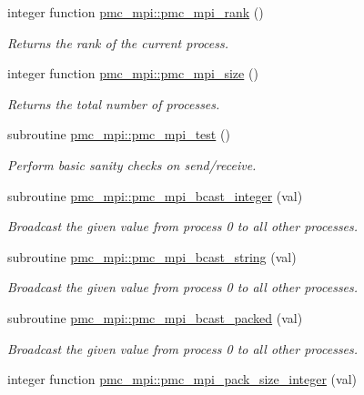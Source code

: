 \begin{DoxyCompactItemize}
integer function \mbox{\hyperlink{namespacepmc__mpi_a1ac93b34387cb8dec130a10c4f959e9b}{pmc\+\_\+mpi\+::pmc\+\_\+mpi\+\_\+rank}} ()
\begin{DoxyCompactList}\small\item\em Returns the rank of the current process. \end{DoxyCompactList}\item 
integer function \mbox{\hyperlink{namespacepmc__mpi_abc7ec25375502391c6ab03a7459b5cd0}{pmc\+\_\+mpi\+::pmc\+\_\+mpi\+\_\+size}} ()
\begin{DoxyCompactList}\small\item\em Returns the total number of processes. \end{DoxyCompactList}\item 
subroutine \mbox{\hyperlink{namespacepmc__mpi_a92cc3237c6fa0152c4da6571ba5fdef9}{pmc\+\_\+mpi\+::pmc\+\_\+mpi\+\_\+test}} ()
\begin{DoxyCompactList}\small\item\em Perform basic sanity checks on send/receive. \end{DoxyCompactList}\item 
subroutine \mbox{\hyperlink{namespacepmc__mpi_a8c5c43ef03395c028808ccc21c6afb1b}{pmc\+\_\+mpi\+::pmc\+\_\+mpi\+\_\+bcast\+\_\+integer}} (val)
\begin{DoxyCompactList}\small\item\em Broadcast the given value from process 0 to all other processes. \end{DoxyCompactList}\item 
subroutine \mbox{\hyperlink{namespacepmc__mpi_a4cd3eb742c928a5f4f796dd8d76263cc}{pmc\+\_\+mpi\+::pmc\+\_\+mpi\+\_\+bcast\+\_\+string}} (val)
\begin{DoxyCompactList}\small\item\em Broadcast the given value from process 0 to all other processes. \end{DoxyCompactList}\item 
subroutine \mbox{\hyperlink{namespacepmc__mpi_aa53168e6f5f0abea92823b4254e57f70}{pmc\+\_\+mpi\+::pmc\+\_\+mpi\+\_\+bcast\+\_\+packed}} (val)
\begin{DoxyCompactList}\small\item\em Broadcast the given value from process 0 to all other processes. \end{DoxyCompactList}\item 
integer function \mbox{\hyperlink{namespacepmc__mpi_a6aecc2f35230f53108b4580ce75afe2d}{pmc\+\_\+mpi\+::pmc\+\_\+mpi\+\_\+pack\+\_\+size\+\_\+integer}} (val)

\end{DoxyCompactItemize}
